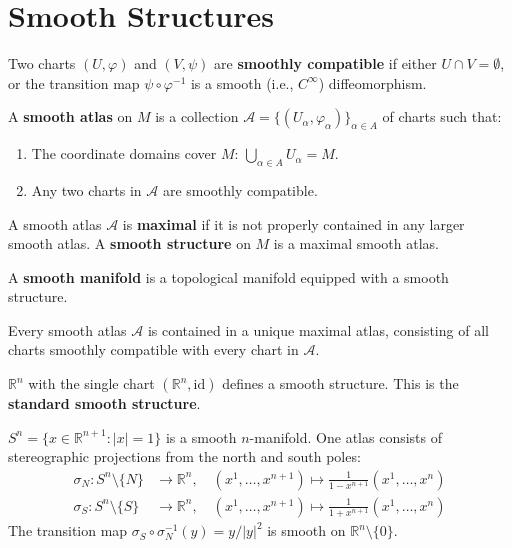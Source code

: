 \section{Smooth Structures}

\begin{definition}
    Two charts $(U, \varphi)$ and $(V, \psi)$ are \textbf{smoothly compatible} if either $U \cap V = \emptyset$, or the transition map $\psi \circ \varphi^{-1}$ is a smooth (i.e., $C^\infty$) diffeomorphism.
\end{definition}

\begin{definition}
    A \textbf{smooth atlas} on $M$ is a collection $\mathcal{A} = \{(U_\alpha, \varphi_\alpha)\}_{\alpha \in A}$ of charts such that:
    \begin{enumerate}
        \item The coordinate domains cover $M$: $\bigcup_{\alpha \in A} U_\alpha = M$.
        \item Any two charts in $\mathcal{A}$ are smoothly compatible.
    \end{enumerate}
\end{definition}

\begin{definition}
    A smooth atlas $\mathcal{A}$ is \textbf{maximal} if it is not properly contained in any larger smooth atlas. A \textbf{smooth structure} on $M$ is a maximal smooth atlas.

    A \textbf{smooth manifold} is a topological manifold equipped with a smooth structure.
\end{definition}

\begin{proposition}
    Every smooth atlas $\mathcal{A}$ is contained in a unique maximal atlas, consisting of all charts smoothly compatible with every chart in $\mathcal{A}$.
\end{proposition}

\begin{example}
    $\mathbb{R}^n$ with the single chart $(\mathbb{R}^n, \mathrm{id})$ defines a smooth structure. This is the \textbf{standard smooth structure}.
\end{example}

\begin{example}
    $S^n = \{x \in \mathbb{R}^{n+1} : |x| = 1\}$ is a smooth $n$-manifold. One atlas consists of stereographic projections from the north and south poles:
    \begin{align*}
        \sigma_N: S^n \setminus \{N\} & \to \mathbb{R}^n, \quad (x^1, \ldots, x^{n+1}) \mapsto \frac{1}{1 - x^{n+1}}(x^1, \ldots, x^n) \\
        \sigma_S: S^n \setminus \{S\} & \to \mathbb{R}^n, \quad (x^1, \ldots, x^{n+1}) \mapsto \frac{1}{1 + x^{n+1}}(x^1, \ldots, x^n)
    \end{align*}
    The transition map $\sigma_S \circ \sigma_N^{-1}(y) = y/|y|^2$ is smooth on $\mathbb{R}^n \setminus \{0\}$.
\end{example}

